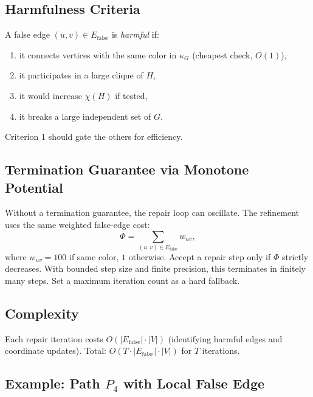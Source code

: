 \documentclass[11pt]{article}
\newcommand{\Efalse}{E_{\mathrm{false}}}
\newcommand{\chihat}{\widehat{\chi}}
\begin{document}
\subsection{Harmfulness Criteria}

A false edge $(u,v) \in \Efalse$ is \emph{harmful} if:
\begin{enumerate}
  \item it connects vertices with the same color in $\kappa_G$ (cheapest check, $O(1)$),
  \item it participates in a large clique of $H$,
  \item it would increase $\chihat(H)$ if tested,
  \item it breaks a large independent set of $G$.
\end{enumerate}
Criterion 1 should gate the others for efficiency.

\subsection{Termination Guarantee via Monotone Potential}

Without a termination guarantee, the repair loop can oscillate. The refinement
uses the same weighted false-edge cost:
\[
  \Phi = \sum_{(u,v) \in \Efalse} w_{uv},
\]
where $w_{uv} = 100$ if same color, $1$ otherwise. Accept a repair step only
if $\Phi$ strictly decreases. With bounded step size and finite precision,
this terminates in finitely many steps. Set a maximum iteration count as a
hard fallback.

\subsection{Complexity}

Each repair iteration costs $O(|\Efalse| \cdot |V|)$ (identifying harmful edges
and coordinate updates). Total: $O(T \cdot |\Efalse| \cdot |V|)$ for $T$
iterations.

\subsection{Example: Path $P_4$ with Local False Edge}
\end{document}
